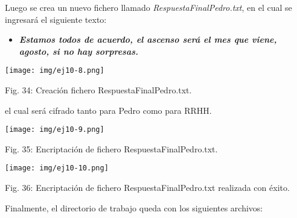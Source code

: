 \documentclass[12pt,oneside,a4paper]{book}
\begin{document}
\vspace{2em}

\hspace{20pt}
Luego se crea un nuevo fichero llamado \textit{RespuestaFinalPedro.txt}, en el cual se ingresará el siguiente texto:

\vspace{1em}

\begin{itemize}
    \item \textbf{\textit{Estamos todos de acuerdo, el ascenso será el mes que viene, agosto, si no hay sorpresas.}}
\end{itemize}

\vspace{2em}

\begin{center}
    \texttt{[image: img/ej10-8.png]}
    
\vspace{0.1em}
    
    Fig. 34: Creación fichero RespuestaFinalPedro.txt.
\end{center}

\vspace{2em}

el cual será cifrado tanto para Pedro como para RRHH.

\vspace{2em}

\begin{center}
    \texttt{[image: img/ej10-9.png]}
    
\vspace{0.1em}
    
    Fig. 35: Encriptación de fichero RespuestaFinalPedro.txt.
\end{center}

\vspace{2em}

\begin{center}
    \texttt{[image: img/ej10-10.png]}
    
\vspace{0.1em}
    
    Fig. 36: Encriptación de fichero RespuestaFinalPedro.txt realizada con éxito.
\end{center}

\vspace{2em}

\hspace{20pt}
Finalmente, el directorio de trabajo queda con los siguientes archivos:
\end{document}
